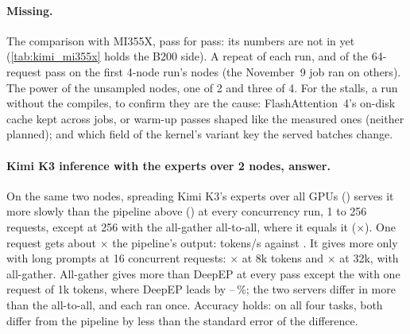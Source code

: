 \paragraph{Missing.} The comparison with MI355X, pass for pass: its numbers are not in yet (\cref{tab:kimi_mi355x} holds the B200 side). A repeat of each run, and of the 64-request pass on the first 4-node run's nodes (the November~9 job ran on others). The power of the unsampled nodes, one of 2 and three of 4. For the stalls, a run without the compiles, to confirm they are the cause: FlashAttention~4's on-disk cache kept across jobs, or warm-up passes shaped like the measured ones (neither planned); and which field of the kernel's variant key the served batches change.

\paragraph{Kimi K3 inference with the experts over 2 nodes, answer.} On the same two nodes, spreading Kimi K3's experts over all \TriKxnGpus{} GPUs (\TriKxnLayout) serves it more slowly than the pipeline above (\TriKimiLayout) at every concurrency run, 1 to 256 requests, except at 256 with the all-gather all-to-all, where it equals it (\TriKxnTwoFiftySixRatioAg$\times$). One request gets about \TriKxnOneRatioAg$\times$ the pipeline's output: \TriKxnOneTokAg{} tokens/s against \TriKimiOneTok. It gives more only with long prompts at 16 concurrent requests: \TriKxnCtxEightSixteenRatioAg$\times$ at 8k tokens and \TriKxnCtxThirtyTwoSixteenRatioAg$\times$ at 32k, with all-gather. All-gather gives more than DeepEP at every pass except the \TriKxnDpLeadN{} with one request of 1k tokens, where DeepEP leads by \TriKxnDpLeadLo--\TriKxnDpLeadHi\,\%; the two servers differ in more than the all-to-all, and each ran once. Accuracy holds: on all four tasks, both differ from the pipeline by less than the standard error of the difference.

